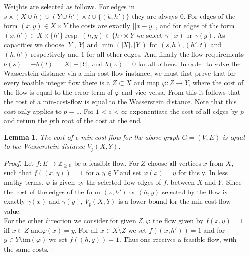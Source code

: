 \documentclass[11pt, a4paper,draft]{report}
\newtheorem{lemma}{Lemma}
\newcommand{\bZ}{\mathbb{Z}}
\newcommand{\im}{\textrm{im}}
\begin{document}
 	Weights are selected as follows. For edges in ${s}\times (X\cup h) \cup (Y\cup h')\times t \cup \{(h,h')\}$ they are always 0. For edges of the form $(x,y)\in X\times Y$ the costs are exactly $||x-y||$, and for edges of the form $(x,h')\in X\times \{h'\}$ resp. $(h,y)\in \{h\}\times Y$ we select $\gamma(x)$ or $\gamma(y)$. As capacities we choose $|Y|,|Y|$ and $\min(|X|,|Y|)$ for $(s,h),(h',t)$ and $(h,h')$ respectively and $1$ for all other edges. And finally the flow requirements $b(s) = -b(t) = |X|+|Y|$, and $b(v)=0$ for all others. In order to solve the Wasserstein distance via a min-cost flow instance, we must first prove that for every feasible integer flow there is a $Z\subset X$ and map $\varphi:Z\rightarrow Y$, where the cost of the flow is equal to the error term of $\varphi$ and vice versa. From this it follows that the cost of a min-cost-flow is equal to the Wasserstein distance. Note that this cost only applies to $p=1$. For $1<p<\infty$ exponentiate the cost of all edges by $p$ and return the $p$th root of the cost at the end.
 	
 	\begin{lemma}
 		The cost of a min-cost-flow for the above graph $G=(V,E)$ is equal to the Wasserstein distance $V_p(X,Y)$.
 	\end{lemma}
 	\begin{proof}
  		Let $f:E\rightarrow \bZ_{\geq0}$ be a feasible flow. For $Z$ choose all vertices $x$ from $X$, such that $f((x,y))=1$ for a $y\in Y$ and set $\varphi(x) = y$ for this y. In less mathy terms, $\varphi$ is given by the selected flow edges of $f$, between $X$ and $Y$. Since the cost of the edges of the form $(x,h')$ or $(h,y)$ selected by the flow is exactly $\gamma(x)$ and $\gamma(y)$, $V_p(X,Y)$ is a lower bound for the min-cost-flow value.\\
For the other direction we consider for given $Z,\varphi$ the flow given by $f(x,y)=1$ iff $x\in Z$ and$ \varphi(x)=y$. For all $x\in X\setminus Z$ we set $f((x,h'))=1$ and for $y\in Y\setminus \im(\varphi)$ we set $f((h,y))=1$. Thus one receives a feasible flow, with the same costs.
 	\end{proof}
 
\end{document}
